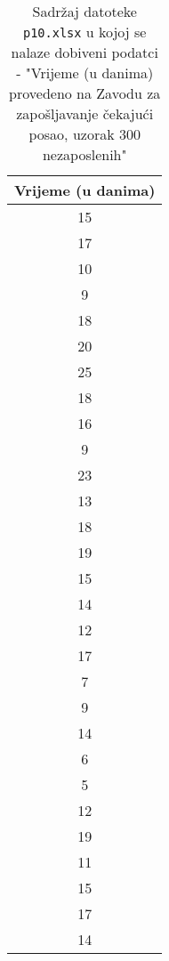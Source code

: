 \documentclass[a4paper, 12pt]{article}
\begin{document}



\newpage


\newpage


\newpage


\newpage


\newpage


\newpage


\newpage

\begin{appendices}
\appendix

\begin{longtable}{|c|}
\caption{Sadržaj datoteke \texttt{p10.xlsx} u kojoj se nalaze dobiveni podatci - "Vrijeme (u danima) provedeno na Zavodu za zapošljavanje čekajući posao, uzorak 300 nezaposlenih"}
\label{tab:dataSample}
\\
\hline
\textbf{Vrijeme (u danima)}\\
\hline
15  \\
17  \\
10  \\
9   \\
18  \\
20  \\
25  \\
18  \\
16  \\
9   \\
23  \\
13  \\
18  \\
19  \\
15  \\
14  \\
12  \\
17  \\
7   \\
9   \\
14  \\
6   \\
5   \\
12  \\
19  \\
11  \\
15  \\
17  \\
14  \\

\end{longtable}
\end{appendices}
\end{document}

